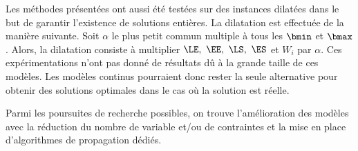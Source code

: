 Les méthodes présentées ont aussi été testées sur des instances
dilatées dans le but de garantir l'existence de solutions entières.  
La dilatation est effectuée de la manière suivante. Soit $\alpha$ le
plus petit commun 
multiple à tous les $\bmin$ et $\bmax$. Alors, la dilatation
consiste à multiplier $\LE,\ \EE,\
\LS,\ \ES$ et $W_i$ par $\alpha$. Ces
expérimentations n'ont pas donné de résultats dû à la grande taille
de ces modèles. Les modèles continus pourraient donc rester  la
seule alternative pour obtenir des solutions optimales dans le cas où
la solution est réelle.

Parmi les poursuites de recherche possibles, on trouve l'amélioration
des modèles avec la réduction du nombre de variable et/ou de contraintes et la
mise en place d'algorithmes de propagation dédiés.

\begin{bibunit}[alpha]
\nocite{JFPC}
\nocite*
\putbib[JFPC]
\end{bibunit}







